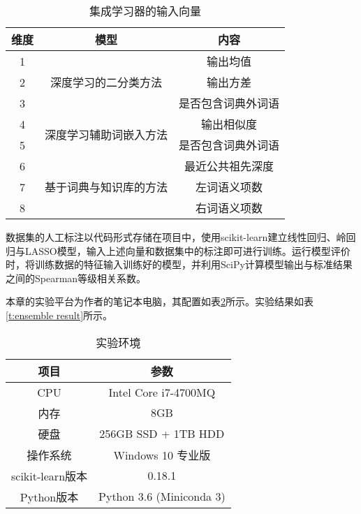 \begin{table}[h]
	\caption{集成学习器的输入向量}
	\label{t:features}
	\vspace{0.5em}\centering\wuhao
	\begin{tabular}{ccc}
		\toprule[1.5pt]
		维度 & 模型 & 内容 \\
		\midrule[1pt]
		1 & \multirow{3}{*}{深度学习的二分类方法} & 输出均值 \\
		2 &  & 输出方差 \\
		3 &  & 是否包含词典外词语 \\
		\hline
		4 & \multirow{2}{*}{深度学习辅助词嵌入方法} & 输出相似度 \\
		5 &  & 是否包含词典外词语 \\
		\hline
		6 & \multirow{3}{*}{基于词典与知识库的方法} & 最近公共祖先深度 \\
		7 &  & 左词语义项数 \\
		8 &  & 右词语义项数 \\
		\bottomrule[1.5pt]
	\end{tabular}
\end{table}

数据集的人工标注以代码形式存储在项目中，使用scikit-learn建立线性回归、岭回归与LASSO模型，输入上述向量和数据集中的标注即可进行训练。运行模型评价时，将训练数据的特征输入训练好的模型，并利用SciPy计算模型输出与标准结果之间的Spearman等级相关系数。

本章的实验平台为作者的笔记本电脑，其配置如表\ref{t:local environment}所示。实验结果如表\ref{t:ensemble result}所示。

\begin{table}[h]
	\caption{实验环境}
	\label{t:local environment}
	\vspace{0.5em}\centering\wuhao
	\begin{tabular}{cc}
		\toprule[1.5pt]
		项目 & 参数 \\
		\midrule[1pt]
		CPU & Intel Core i7-4700MQ \\
		内存 & 8GB \\
		硬盘 & 256GB SSD + 1TB HDD \\
		操作系统 & Windows 10 专业版 \\
		scikit-learn版本 & 0.18.1 \\
		Python版本 & Python 3.6 (Miniconda 3) \\
		\bottomrule[1.5pt]
	\end{tabular}
\end{table}

